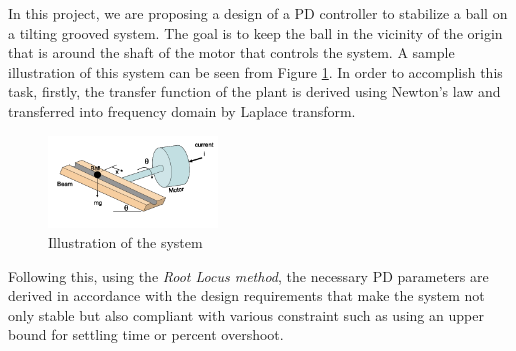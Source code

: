 In this project, we are proposing a design of a PD controller to stabilize a ball on a tilting grooved system. 
The goal is to keep the ball in the vicinity of the origin that is around the shaft of the motor that controls the system. A sample illustration of this system can be seen from Figure \ref{fig:illustration}. In order to accomplish this task, firstly, the transfer function of the plant is derived using Newton's law and transferred into frequency domain by Laplace transform. \\

\begin{figure}[H]
    \centering
    \includegraphics[width=0.4\textwidth]{images/intro_illustration.png}
    \caption{Illustration of the system}
    \label{fig:illustration}
\end{figure}

Following this, using the \textit{Root Locus method}, the necessary PD parameters are derived in accordance with the design requirements that make the system not only stable but also compliant with various constraint such as using an upper bound for settling time or percent overshoot.